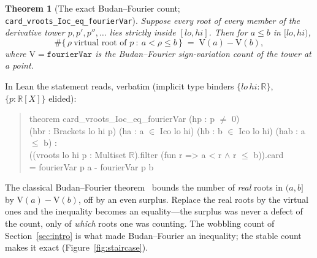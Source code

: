 \documentclass[11pt]{article}
\newtheorem{theorem}{Theorem}
\newcommand{\lean}[1]{\texttt{#1}}
\newcommand{\R}{\mathbb{R}}
\newcommand{\V}{\mathrm{V}}
\begin{document}
\begin{theorem}[The exact Budan--Fourier count; \lean{card\_vroots\_Ioc\_eq\_fourierVar}]\label{thm:count}
Suppose every root of every member of the derivative tower $p,p',p'',\dots$ lies strictly inside
$[lo,hi]$. Then for $a\le b$ in $[lo,hi)$,
\[
  \#\{\,\rho\ \text{virtual root of }p\ :\ a<\rho\le b\,\}\;=\;\V(a)-\V(b),
\]
where $\V=\lean{fourierVar}$ is the Budan--Fourier sign-variation count of the tower at a point.
\end{theorem}

\noindent In Lean the statement reads, verbatim (implicit type binders $\{lo\,hi:\R\}$,
$\{p:\R[X]\}$ elided):
\begin{quote}\ttfamily\small\noindent
theorem card\_vroots\_Ioc\_eq\_fourierVar (hp : p $\neq$ 0)\\
\hspace*{1em}(hbr : Brackets lo hi p) (ha : a $\in$ Ico lo hi) (hb : b $\in$ Ico lo hi) (hab : a $\le$ b) :\\
\hspace*{1em}((vroots lo hi p : Multiset $\mathbb{R}$).filter (fun r => a < r $\wedge$ r $\le$ b)).card\\
\hspace*{2em}= fourierVar p a - fourierVar p b
\end{quote}

\noindent The classical Budan--Fourier theorem~\cite{bflean} bounds the number of \emph{real} roots in
$(a,b]$ by $\V(a)-\V(b)$, off by an even surplus. Replace the real roots by the virtual ones and the
inequality becomes an equality---the surplus was never a defect of the count, only of \emph{which}
roots one was counting. The wobbling count of Section~\ref{sec:intro} is what made Budan--Fourier an
inequality; the stable count makes it exact (Figure~\ref{fig:staircase}).
\end{document}
